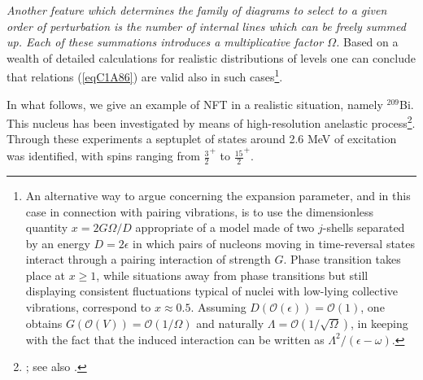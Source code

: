 \textit{Another feature which determines the family of diagrams to select to a given order of perturbation is the number of internal lines which can be freely summed up. Each of these summations introduces a multiplicative factor $\Omega$.} Based on a wealth of detailed calculations for realistic distributions of levels one can conclude that  relations (\ref{eqC1A86}) are valid also in such cases\footnote{\label{fn107} An alternative way to argue concerning the expansion parameter, and in this case in connection with pairing vibrations, is to use the dimensionless quantity $x=2G\Omega/D$ appropriate of a model made of two $j$-shells separated by an energy $D=2\epsilon$ in which pairs of nucleons moving in time-reversal states interact through a pairing interaction of strength $G$. Phase transition takes place at $x\geq1$, while situations away from phase transitions but still displaying consistent fluctuations typical of nuclei with low-lying collective vibrations, correspond to $x\approx0.5$. Assuming $D(\mathcal O(\epsilon))=\mathcal O(1)$, one obtains $G(\mathcal O(V))=\mathcal O(1/\Omega)$ and naturally $\Lambda=\mathcal O(1/\sqrt{\Omega})$, in keeping with the fact that the induced interaction can be written as $\Lambda^2/(\epsilon-\omega)$.}.


  In what follows, we give an example of NFT in a realistic situation, namely $^{209}$Bi. 
This nucleus has been investigated by means of high-resolution anelastic process\footnote{\cite{Ungrin:71}; see also \cite{Bohr:75}.}. Through these experiments a septuplet of states around 2.6 MeV of excitation was identified, with spins 
ranging from $\frac{3}{2}^+$ to $\frac{15}{2}^+$. 


